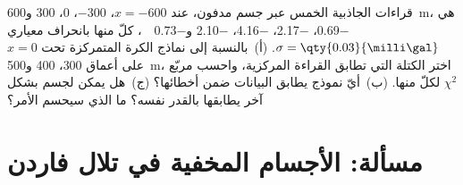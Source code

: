 \begin{exercise}[$\star\star\star$]\label{exo:b3:field-lab-methods-3:12}
قراءات الجاذبية الخمس عبر جسم مدفون، عند $x = -600$، $-300$، $0$،
$300$ و\qty{600}{m}، هي \num{-0.69}، \num{-2.17}، \num{-4.16}،
\num{-2.10} و\qty{-0.73}{\milli\gal}، كلّ منها بانحراف معياري $\sigma =
\qty{0.03}{\milli\gal}$. (أ)~بالنسبة إلى نماذج الكرة المتمركزة تحت $x = 0$ على أعماق
\num{300}، \num{400} و\qty{500}{m}، اختر الكتلة التي تطابق
القراءة المركزية، واحسب مربّع  $\chi^2$ لكلّ منها. (ب)~أيّ
نموذج يطابق البيانات ضمن أخطائها؟ (ج)~هل يمكن لجسم بشكل آخر
يطابقها بالقدر نفسه؟ ما الذي سيحسم الأمر؟
\end{exercise}

\section{مسألة: الأجسام المخفية في تلال فاردن}

